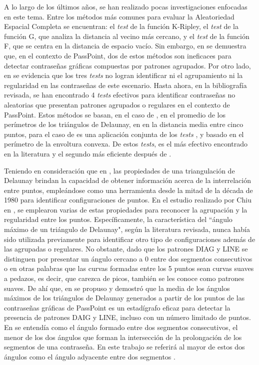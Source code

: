 \documentclass[12pt]{report}
\begin{document}
	A lo largo de los últimos años, se han realizado pocas investigaciones enfocadas en este tema. Entre los métodos más comunes para evaluar la Aleatoriedad Espacial Completa se encuentran: el \textit{test} de la función K-Ripley, el \textit{test} de la función G, que analiza la distancia al vecino más cercano, y el \textit{test} de la función F, que se centra en la distancia de espacio vacío. Sin embargo, en \cite{6,7} se demuestra que, en el contexto de PassPoint, dos de estos métodos son ineficaces para detectar contraseñas gráficas compuestas por patrones agrupados. Por otro lado, en \cite{7,8} se evidencia que los tres \textit{tests} no logran identificar ni el agrupamiento ni la regularidad en las contraseñas de este escenario. Hasta ahora, en la bibliografía revisada, se han encontrado 4 \textit{tests} efectivos \cite{7,9,10,11} para identificar contraseñas no aleatorias que presentan patrones agrupados o regulares en el contexto de PassPoint. Estos métodos se basan, en el caso de \cite{9}, en el promedio de los perímetros de los triángulos de Delaunay, en  \cite{7} en la distancia media entre cinco puntos, para el caso de \cite{10} es una aplicación conjunta de los \textit{tests} \cite{7,9}, y \cite{11} basado en  el perímetro de la envoltura convexa. De estos \textit{tests}, \cite{11} es el más efectivo encontrado en la literatura y el segundo más eficiente después de \cite{7}.
	
	Teniendo en consideración que en \cite{12}, las propiedades de una triangulación de Delaunay brindan la capacidad de obtener información acerca de la interrelación entre puntos, empleándose como una herramienta desde la mitad de la década de 1980 para identificar configuraciones de puntos. En el estudio realizado por Chiu en \cite{12}, se emplearon varias de estas propiedades para reconocer la agrupación y la regularidad entre los puntos. Específicamente, la característica del ``ángulo máximo de un triángulo de Delaunay", según la literatura revisada, nunca había sido utilizada previamente para identificar otro tipo de configuraciones además de las agrupadas o regulares. No obstante, dado que los patrones DIAG y LINE se distinguen por presentar un ángulo cercano a 0{\degree } entre dos segmentos consecutivos o en otras palabras que las curvas formadas entre los 5 puntos sean curvas suaves a pedazos, es decir, que carezca de picos, también se les conoce como patrones suaves.  De ahí que, en \cite{13} se propuso y demostró que la media de los ángulos máximos de los triángulos de Delaunay generados a partir de los puntos de las contraseñas gráficas de PassPoint es un estadígrafo eficaz para detectar la presencia de patrones DAIG y LINE, incluso con un número limitado de puntos. En \cite{5} se entendía como el ángulo formado entre dos segmentos consecutivos, el menor de los dos ángulos que forman la intersección de la prolongación de los segmentos de una contraseña. En este trabajo se referirá al mayor de estos dos ángulos como el ángulo adyacente entre dos segmentos .
\end{document}
